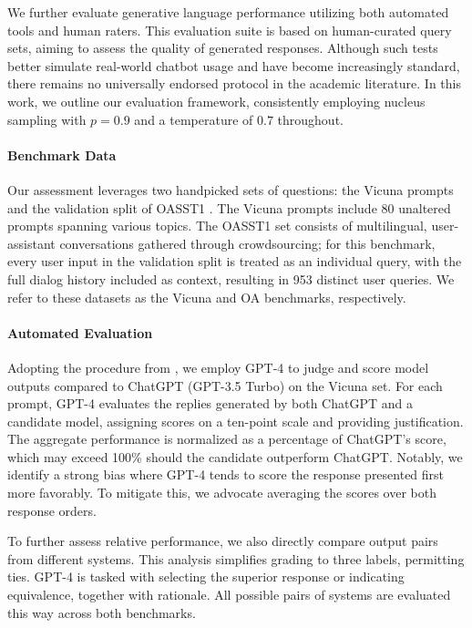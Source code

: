 We further evaluate generative language performance utilizing both automated tools and human raters. This evaluation suite is based on human-curated query sets, aiming to assess the quality of generated responses. Although such tests better simulate real-world chatbot usage and have become increasingly standard, there remains no universally endorsed protocol in the academic literature. In this work, we outline our evaluation framework, consistently employing nucleus sampling with $p=0.9$ and a temperature of $0.7$ throughout.

\paragraph{Benchmark Data} Our assessment leverages two handpicked sets of questions: the Vicuna prompts \citep{vicuna2023} and the validation split of OASST1 \citep{kopf2023openassistant}. The Vicuna prompts include 80 unaltered prompts spanning various topics. The OASST1 set consists of multilingual, user-assistant conversations gathered through crowdsourcing; for this benchmark, every user input in the validation split is treated as an individual query, with the full dialog history included as context, resulting in 953 distinct user queries. We refer to these datasets as the Vicuna and OA benchmarks, respectively.

\paragraph{Automated Evaluation} Adopting the procedure from \citet{vicuna2023}, we employ GPT-4 to judge and score model outputs compared to ChatGPT (GPT-3.5 Turbo) on the Vicuna set. For each prompt, GPT-4 evaluates the replies generated by both ChatGPT and a candidate model, assigning scores on a ten-point scale and providing justification. The aggregate performance is normalized as a percentage of ChatGPT's score, which may exceed 100\% should the candidate outperform ChatGPT. Notably, we identify a strong bias where GPT-4 tends to score the response presented first more favorably. To mitigate this, we advocate averaging the scores over both response orders.

To further assess relative performance, we also directly compare output pairs from different systems. This analysis simplifies grading to three labels, permitting ties. GPT-4 is tasked with selecting the superior response or indicating equivalence, together with rationale. All possible pairs of systems are evaluated this way across both benchmarks.


